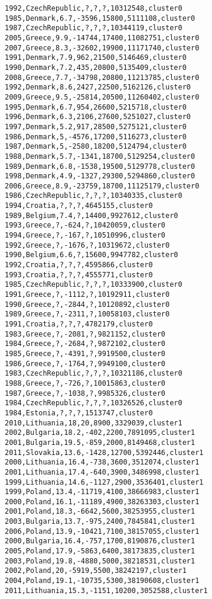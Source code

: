\begin{lstlisting}[basicstyle=\footnotesize\ttfamily,numbers=none]
1992,CzechRepublic,?,?,?,10312548,cluster0
1985,Denmark,6.7,-3596,15800,5111108,cluster0
1987,CzechRepublic,?,?,?,10344119,cluster0
2005,Greece,9.9,-14744,17400,11082751,cluster0
2007,Greece,8.3,-32602,19900,11171740,cluster0
1991,Denmark,7.9,962,21500,5146469,cluster0
1990,Denmark,7.2,435,20800,5135409,cluster0
2008,Greece,7.7,-34798,20800,11213785,cluster0
1992,Denmark,8.6,2427,22500,5162126,cluster0
2009,Greece,9.5,-25814,20500,11260402,cluster0
1995,Denmark,6.7,954,26600,5215718,cluster0
1996,Denmark,6.3,2106,27600,5251027,cluster0
1997,Denmark,5.2,917,28500,5275121,cluster0
1986,Denmark,5,-4576,17200,5116273,cluster0
1987,Denmark,5,-2580,18200,5124794,cluster0
1988,Denmark,5.7,-1341,18700,5129254,cluster0
1989,Denmark,6.8,-1538,19500,5129778,cluster0
1998,Denmark,4.9,-1327,29300,5294860,cluster0
2006,Greece,8.9,-23759,18700,11125179,cluster0
1986,CzechRepublic,?,?,?,10340335,cluster0
1994,Croatia,?,?,?,4645155,cluster0
1989,Belgium,7.4,?,14400,9927612,cluster0
1993,Greece,?,-624,?,10420059,cluster0
1994,Greece,?,-167,?,10510996,cluster0
1992,Greece,?,-1676,?,10319672,cluster0
1990,Belgium,6.6,?,15600,9947782,cluster0
1992,Croatia,?,?,?,4595866,cluster0
1993,Croatia,?,?,?,4555771,cluster0
1985,CzechRepublic,?,?,?,10333900,cluster0
1991,Greece,?,-1112,?,10192911,cluster0
1990,Greece,?,-2844,?,10120892,cluster0
1989,Greece,?,-2311,?,10058103,cluster0
1991,Croatia,?,?,?,4782179,cluster0
1983,Greece,?,-2081,?,9821152,cluster0
1984,Greece,?,-2684,?,9872102,cluster0
1985,Greece,?,-4391,?,9919500,cluster0
1986,Greece,?,-1764,?,9949100,cluster0
1983,CzechRepublic,?,?,?,10321186,cluster0
1988,Greece,?,-726,?,10015863,cluster0
1987,Greece,?,-1038,?,9985326,cluster0
1984,CzechRepublic,?,?,?,10326526,cluster0
1984,Estonia,?,?,?,1513747,cluster0
2010,Lithuania,18,20,8900,3329039,cluster1
2002,Bulgaria,18.2,-402,2200,7891095,cluster1
2001,Bulgaria,19.5,-859,2000,8149468,cluster1
2011,Slovakia,13.6,-1428,12700,5392446,cluster1
2000,Lithuania,16.4,-738,3600,3512074,cluster1
2001,Lithuania,17.4,-640,3900,3486998,cluster1
1999,Lithuania,14.6,-1127,2900,3536401,cluster1
1999,Poland,13.4,-11719,4100,38666983,cluster1
2000,Poland,16.1,-11189,4900,38263303,cluster1
2001,Poland,18.3,-6642,5600,38253955,cluster1
2003,Bulgaria,13.7,-975,2400,7845841,cluster1
2006,Poland,13.9,-10421,7100,38157055,cluster1
2000,Bulgaria,16.4,-757,1700,8190876,cluster1
2005,Poland,17.9,-5863,6400,38173835,cluster1
2003,Poland,19.8,-4880,5000,38218531,cluster1
2002,Poland,20,-5919,5500,38242197,cluster1
2004,Poland,19.1,-10735,5300,38190608,cluster1
2011,Lithuania,15.3,-1151,10200,3052588,cluster1

\end{lstlisting}
